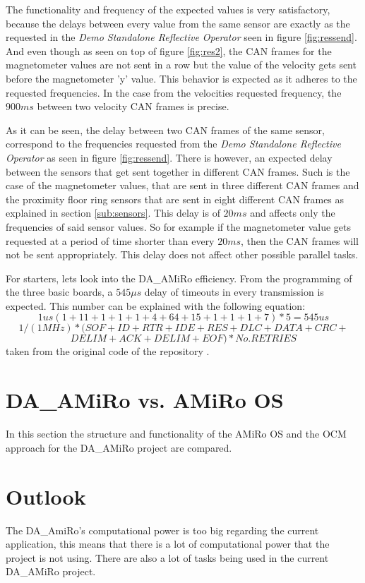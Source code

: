 \documentclass[12pt]{report}%
\begin{document}
The functionality and frequency of the expected values is very satisfactory, because the delays between every value from the same sensor are exactly as the requested in the \textit{Demo Standalone Reflective Operator} seen in figure \ref{fig:ressend}. And even though as seen on top of figure \ref{fig:res2}, the CAN frames for the magnetometer values are not sent in a row but the value of the velocity gets sent before the magnetometer 'y' value. This behavior is expected as it adheres to the requested frequencies. In the case from the velocities requested frequency, the $900ms$ between two velocity CAN frames is precise.

As it can be seen, the delay between two CAN frames of the same sensor, correspond to the frequencies requested from the \textit{Demo Standalone Reflective Operator} as seen in figure \ref{fig:ressend}. There is however, an expected delay between the sensors that get sent together in different CAN frames. Such is the case of the magnetometer values, that are sent in three different CAN frames and the proximity floor ring sensors that are sent in eight different CAN frames as explained in section \ref{sub:sensors}. This delay is of $20ms$ and affects only the frequencies of said  sensor values. So for example if the magnetometer value gets requested at a period of time shorter than every $20ms$, then the CAN frames will not be sent appropriately. This delay does not affect other possible parallel tasks.

For starters, lets look into the DA\_AMiRo efficiency. From the programming of the three basic boards, a $545\mu s$ delay of timeouts in every transmission is expected. This number can be explained with the following equation: $$1 us   (1+11+1+1+1+4+64+15+1+1+1+7)*5= 545 us$$ $$1/(1MHz)*(SOF+ID+RTR+IDE+RES+DLC+DATA+CRC+$$ $$DELIM+ACK+DELIM+EOF)*No. RETRIES$$
taken from the original code of the repository \cite{AMiRo_Wiki}.

\section{DA\_AMiRo vs. AMiRo OS}
In this section the structure and functionality of the AMiRo OS and the OCM approach for the DA\_AMiRo project are compared.

\section{Outlook}
The DA\_AmiRo's computational power is too big regarding the current application, this means that there is a lot of computational power that the project is not using. There are also a lot of tasks being used in the current DA\_AMiRo project.

\printbibliography
\nocite{*}
\end{document}
